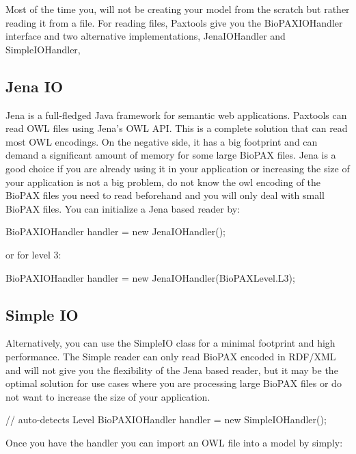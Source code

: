 \documentclass{tufte-book}
\begin{document}
Most of the time you, will not be creating your model from the scratch but rather reading it from a file. For reading files, Paxtools give you the BioPAXIOHandler interface and two alternative implementations, JenaIOHandler and SimpleIOHandler,

\subsection{Jena IO}

Jena is a full-fledged Java framework for semantic web applications. Paxtools can read OWL files using Jena's OWL API. This is a complete solution that can read most OWL encodings. On the negative side, it has a big footprint and can demand a significant amount of memory for some large BioPAX files. Jena is a good choice if you are already using it in your application or increasing the size of your application is not a big problem, do not know the owl encoding of the BioPAX files you need to read beforehand and you will only deal with small BioPAX files.   
You can initialize a Jena based reader by:

\begin{javacode}
BioPAXIOHandler handler = new JenaIOHandler();
\end{javacode}

or for level 3:

\begin{javacode}
BioPAXIOHandler handler = new JenaIOHandler(BioPAXLevel.L3);
\end{javacode}


\subsection{Simple IO}

Alternatively, you can use the SimpleIO class for a minimal footprint and high performance. The Simple reader can only read BioPAX encoded in RDF/XML and will not give you the flexibility of the Jena based reader, but it may be the optimal solution for use cases where you are processing large BioPAX files or do not want to increase the size of your application.

\begin{javacode}
 // auto-detects Level 
BioPAXIOHandler handler = new SimpleIOHandler();
\end{javacode}


Once you have the handler you can import an OWL file into a model by simply:
\end{document}
